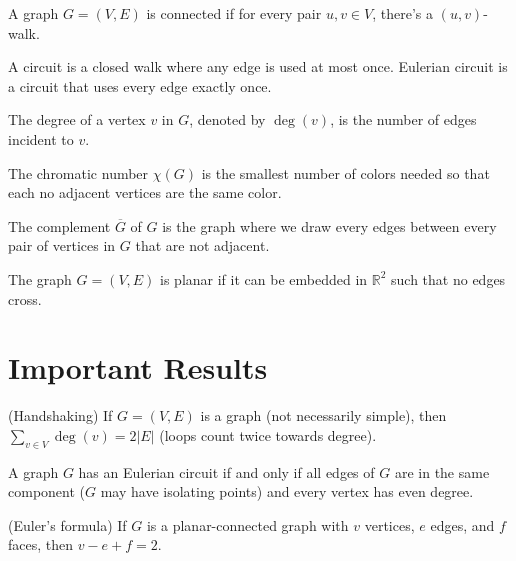 \documentclass{article}
\begin{document}
\begin{definition}
A graph $G = (V, E)$ is connected if for every pair $u, v \in V$, there's a $(u, v)$-walk. 
\end{definition}

\begin{definition}
A circuit is a closed walk where any edge is used at most once. Eulerian circuit is a circuit that uses every edge exactly once. 
\end{definition}

\begin{definition}
The degree of a vertex $v$ in $G$, denoted by $\deg(v)$, is the number of edges incident to $v$. 
\end{definition}

\begin{definition}
The chromatic number $\chi(G)$ is the smallest number of colors needed so that each no adjacent vertices are the same color.
\end{definition}

\begin{definition}
The complement $\overline{G}$ of $G$ is the graph where we draw every edges between every pair of vertices in $G$ that are not adjacent.
\end{definition}

\begin{definition}
The graph $G = (V, E)$ is planar if it can be embedded in $\mathbb{R}^{2}$ such that no edges cross. 
\end{definition}

\section{Important Results}
\begin{lemma}(Handshaking)
If $G = (V, E)$ is a graph (not necessarily simple), then $\sum_{v \in V} \deg(v) = 2|E|$ (loops count twice towards degree).  
\end{lemma}

\begin{theorem}
A graph $G$ has an Eulerian circuit if and only if all edges of $G$ are in the same component ($G$ may have isolating points) and every vertex has even degree.  
\end{theorem}

\begin{theorem}(Euler's formula)
If $G$ is a planar-connected graph with $v$ vertices, $e$ edges, and $f$ faces, then $v - e + f = 2$. 
\end{theorem}
\end{document}
